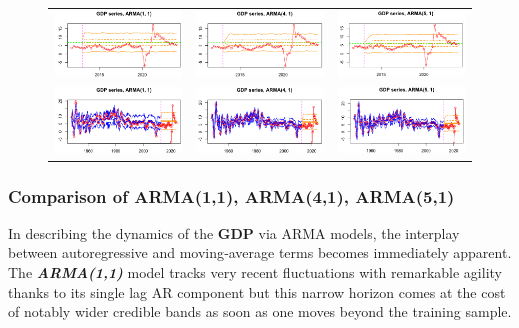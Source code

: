 \documentclass{Configuration_Files/PoliMi3i_thesis}
\begin{document}
\begin{figure}[H]
  \centering
  \begin{tabular}{@{}ccc@{}}
    \includegraphics[angle=90,width=0.3\linewidth]{ZARMA(1,1)-1.png} &
    \includegraphics[angle=90,width=0.302\linewidth]{ZARMA(4,1)-1.png} &
    \includegraphics[angle=90,width=0.305\linewidth]{ZARMA(5,1)-1.png} \\
    \includegraphics[angle=90,width=0.3\linewidth]{FARMA(1,1)-1.png} &
    \includegraphics[angle=90,width=0.3\linewidth]{FARMA(4,1)-1.png} &
    \includegraphics[angle=90,width=0.29\linewidth]{FARMA(5,1)-1.png}
  \end{tabular}
\end{figure}
\newpage
\subsubsection*{Comparison of ARMA(1,1), ARMA(4,1), ARMA(5,1)}
In describing the dynamics of the \textbf{GDP} via ARMA models, the interplay between autoregressive and moving‐average terms becomes immediately apparent. The \textbf{\textit{ARMA(1,1)}} model tracks very recent fluctuations with remarkable agility thanks to its single lag AR component but this narrow horizon comes at the cost of notably wider credible bands as soon as one moves beyond the training sample. 
\end{document}
